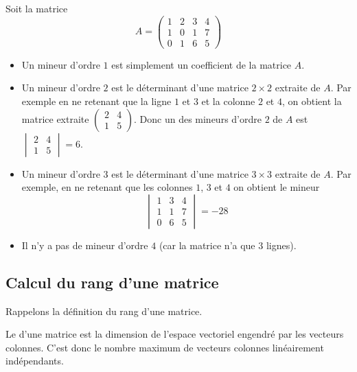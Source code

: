 \documentclass[class=report,crop=false]{standalone}
\begin{document}
\begin{exemple}
Soit la matrice
$$A =
\begin{pmatrix}
1&2&3&4\\
1&0&1&7\\
0&1&6&5
\end{pmatrix}$$

\begin{itemize}
  \item Un mineur d'ordre $1$ est simplement un coefficient de la matrice $A$.

  \item Un mineur d'ordre $2$ est le déterminant d'une matrice $2\times 2$ extraite de $A$.
  Par exemple en ne retenant que la ligne $1$ et $3$ et la colonne $2$ et $4$,
  on obtient la matrice extraite
  $\begin{pmatrix}2&4\\1&5\end{pmatrix}$.
  Donc un des mineurs d'ordre $2$ de $A$ est $\begin{vmatrix}2&4\\1&5\end{vmatrix} = 6$.

  \item Un mineur d'ordre $3$ est le déterminant d'une matrice $3\times 3$ extraite de $A$.
  Par exemple, en ne retenant que les colonnes $1$, $3$ et $4$ on obtient
  le mineur
  \[
  \begin{vmatrix}
1&3&4\\
1&1&7\\
0&6&5
\end{vmatrix} = -28
\]

  \item Il n'y a pas de mineur d'ordre $4$ (car la matrice n'a que $3$ lignes).

\end{itemize}
\end{exemple}


\subsection{Calcul du rang d'une matrice}



Rappelons la définition du rang d'une matrice.

\begin{definition}
Le  d'une matrice est la dimension de l'espace vectoriel
engendré par les vecteurs
colonnes. C'est donc le nombre maximum de vecteurs colonnes
linéairement indépendants.
\end{definition}
\end{document}

